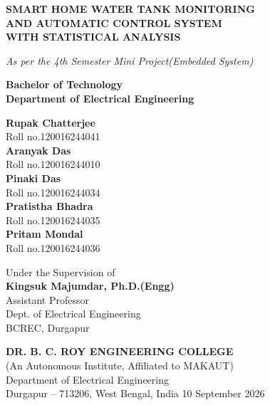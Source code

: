 \documentclass[12pt,a4paper]{article}
\begin{document}

\begin{center}
\vspace{1cm}
{\large\bfseries SMART HOME WATER TANK MONITORING}\\
{\large\bfseries AND AUTOMATIC CONTROL SYSTEM}\\
{\large\bfseries WITH STATISTICAL ANALYSIS}

\vspace{0.5cm}
{\itshape As per the 4th Semester Mini Project(Embedded System)}

\vspace{0.6cm}
\textbf{Bachelor of Technology\\
Department of Electrical Engineering}

\vspace{0.6cm}
\textbf{Rupak Chatterjee} \\
Roll no.120016244041\\
\textbf{Aranyak Das} \\Roll no.120016244010\\
\textbf{Pinaki Das} \\Roll no.120016244034\\
\textbf{Pratistha Bhadra}\\ Roll no.120016244035\\
\textbf{Pritam Mondal} \\Roll no.120016244036

\vspace{0.8cm}
Under the Supervision of\\
\textbf{Kingsuk Majumdar, Ph.D.(Engg)}\\
Assistant Professor\\
Dept. of Electrical Engineering\\
BCREC, Durgapur

\vspace{2.5cm}
{\bfseries DR. B. C. ROY ENGINEERING COLLEGE}\\
{\small (An Autonomous Institute, Affiliated to MAKAUT)}\\
{\small Department of Electrical Engineering}\\
{\small Durgapur -- 713206, West Bengal, India}
\vfill
10 September 2026
\end{center}
\newpage
\end{document}
